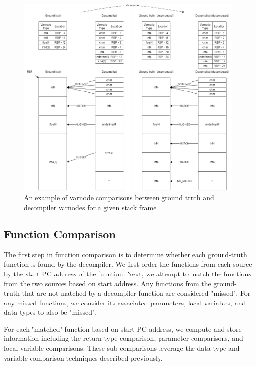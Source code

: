 \begin{figure}
    \centering
    \includegraphics[width=\textwidth]{./figures/stack-comparison.drawio.png}
    \caption{An example of varnode comparisons between ground truth and decompiler varnodes for a given stack frame}
    \label{fig:stack-comparison}
\end{figure}

\subsection{Function Comparison}

The first step in function comparison is to determine whether each ground-truth function is found by the decompiler. We first order the functions from each source by the start PC address of the function. Next, we attempt to match the functions from the two sources based on start address. Any functions from the ground-truth that are not matched by a decompiler function are considered "missed". For any missed functions, we consider its associated parameters, local variables, and data types to also be "missed".

For each "matched" function based on start PC address, we compute and store information including the return type comparison, parameter comparisons, and local variable comparisons. These sub-comparisons leverage the data type and variable comparison techniques described previously.

